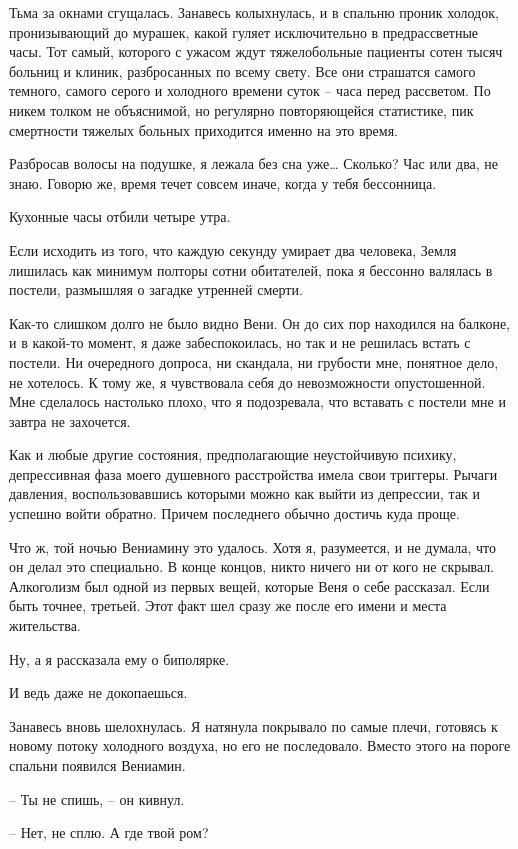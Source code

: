 \documentclass[
]{book}
\begin{document}
Тьма за окнами сгущалась. Занавесь колыхнулась, и в спальню проник холодок, пронизывающий до мурашек, какой гуляет исключительно в предрассветные часы. Тот самый, которого с ужасом ждут тяжелобольные пациенты сотен тысяч больниц и клиник, разбросанных по всему свету. Все они страшатся самого темного, самого серого и холодного времени суток -- часа перед рассветом. По никем толком не объяснимой, но регулярно повторяющейся статистике, пик смертности тяжелых больных приходится именно на это время.

Разбросав волосы на подушке, я лежала без сна уже\ldots{} Сколько? Час или два, не знаю. Говорю же, время течет совсем иначе, когда у тебя бессонница.

Кухонные часы отбили четыре утра.

Если исходить из того, что каждую секунду умирает два человека, Земля лишилась как минимум полторы сотни обитателей, пока я бессонно валялась в постели, размышляя о загадке утренней смерти.

Как-то слишком долго не было видно Вени. Он до сих пор находился на балконе, и в какой-то момент, я даже забеспокоилась, но так и не решилась встать с постели. Ни очередного допроса, ни скандала, ни грубости мне, понятное дело, не хотелось. К тому же, я чувствовала себя до невозможности опустошенной. Мне сделалось настолько плохо, что я подозревала, что вставать с постели мне и завтра не захочется.

Как и любые другие состояния, предполагающие неустойчивую психику, депрессивная фаза моего душевного расстройства имела свои триггеры. Рычаги давления, воспользовавшись которыми можно как выйти из депрессии, так и успешно войти обратно. Причем последнего обычно достичь куда проще.

Что ж, той ночью Вениамину это удалось. Хотя я, разумеется, и не думала, что он делал это специально. В конце концов, никто ничего ни от кого не скрывал. Алкоголизм был одной из первых вещей, которые Веня о себе рассказал. Если быть точнее, третьей. Этот факт шел сразу же после его имени и места жительства.

Ну, а я рассказала ему о биполярке.

И ведь даже не докопаешься.

Занавесь вновь шелохнулась. Я натянула покрывало по самые плечи, готовясь к новому потоку холодного воздуха, но его не последовало. Вместо этого на пороге спальни появился Вениамин.

-- Ты не спишь, -- он кивнул.

-- Нет, не сплю. А где твой ром?
\end{document}
